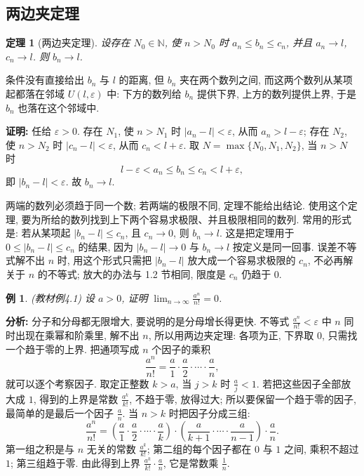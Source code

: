\documentclass[UTF8,openany]{ctexbook}
\theoremstyle{chinesetextbook}
\newtheorem{example}{例}[section]
\newtheorem{theorem}{定理}[section]
\newenvironment{cnproof}{\par\indent\textbf{证明:} \ignorespaces}{\par}
\begin{document}
\subsection{两边夹定理}
\begin{theorem}[两边夹定理]
设存在 $N_0\in\mathbb N$, 使 $n>N_0$ 时 $a_n\le b_n\le c_n$, 并且 $a_n\to l$, $c_n\to l$. 则 $b_n\to l$.
\end{theorem}
条件没有直接给出 $b_n$ 与 $l$ 的距离, 但 $b_n$ 夹在两个数列之间, 而这两个数列从某项起都落在邻域 $U(l,\varepsilon)$ 中: 下方的数列给 $b_n$ 提供下界, 上方的数列提供上界, 于是 $b_n$ 也落在这个邻域中.
\begin{cnproof}
任给 $\varepsilon>0$. 存在 $N_1$, 使 $n>N_1$ 时 $|a_n-l|<\varepsilon$, 从而 $a_n>l-\varepsilon$; 存在 $N_2$, 使 $n>N_2$ 时 $|c_n-l|<\varepsilon$, 从而 $c_n<l+\varepsilon$. 取 $N=\max\{N_0,N_1,N_2\}$, 当 $n>N$ 时
\[
l-\varepsilon<a_n\le b_n\le c_n<l+\varepsilon,
\]
即 $|b_n-l|<\varepsilon$. 故 $b_n\to l$.
\end{cnproof}
两端的数列必须趋于同一个数; 若两端的极限不同, 定理不能给出结论. 使用这个定理, 要为所给的数列找到上下两个容易求极限、并且极限相同的数列. 常用的形式是: 若从某项起 $|b_n-l|\le c_n$, 且 $c_n\to0$, 则 $b_n\to l$. 这是把定理用于 $0\le|b_n-l|\le c_n$ 的结果, 因为 $|b_n-l|\to0$ 与 $b_n\to l$ 按定义是同一回事. 误差不等式解不出 $n$ 时, 用这个形式只需把 $|b_n-l|$ 放大成一个容易求极限的 $c_n$, 不必再解关于 $n$ 的不等式; 放大的办法与 1.2 节相同, 限度是 $c_n$ 仍趋于 $0$.
\begin{example}\label{ex:4-1}
\textnormal{(教材例4.1)} 设 $a>0$, 证明 $\displaystyle\lim_{n\to\infty}\frac{a^n}{n!}=0$.
\end{example}
\par\indent\textbf{分析:} 分子和分母都无限增大, 要说明的是分母增长得更快. 不等式 $\displaystyle\frac{a^n}{n!}<\varepsilon$ 中 $n$ 同时出现在乘幂和阶乘里, 解不出 $n$, 所以用两边夹定理: 各项为正, 下界取 $0$, 只需找一个趋于零的上界. 把通项写成 $n$ 个因子的乘积
\[
\frac{a^n}{n!}=\frac a1\cdot\frac a2\cdot\cdots\cdot\frac an,
\]
就可以逐个考察因子. 取定正整数 $k>a$, 当 $j>k$ 时 $\displaystyle\frac aj<1$. 若把这些因子全部放大成 $1$, 得到的上界是常数 $\displaystyle\frac{a^k}{k!}$, 不趋于零, 放得过大; 所以要保留一个趋于零的因子, 最简单的是最后一个因子 $\displaystyle\frac an$. 当 $n>k$ 时把因子分成三组:
\[
\frac{a^n}{n!}=\left(\frac a1\cdot\frac a2\cdot\cdots\cdot\frac ak\right)\cdot\left(\frac a{k+1}\cdot\cdots\cdot\frac a{n-1}\right)\cdot\frac an.
\]
第一组之积是与 $n$ 无关的常数 $\displaystyle\frac{a^k}{k!}$; 第二组的每个因子都在 $0$ 与 $1$ 之间, 乘积不超过 $1$; 第三组趋于零. 由此得到上界 $\displaystyle\frac{a^k}{k!}\cdot\frac an$, 它是常数乘 $\displaystyle\frac1n$.
\end{document}
